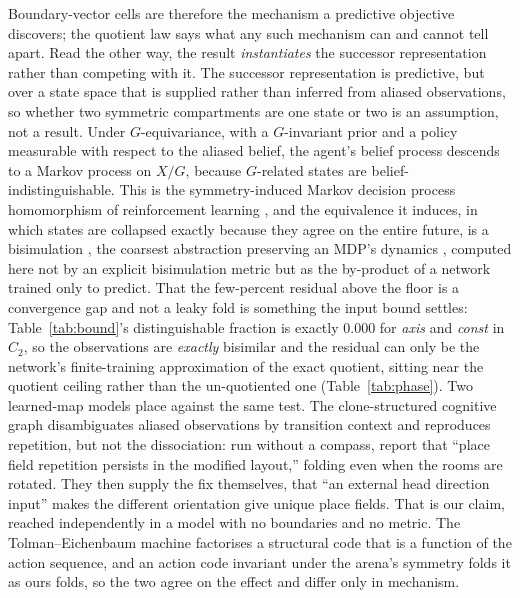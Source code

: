 \documentclass[9pt,lineno]{elife}
\begin{document}
Boundary-vector cells are therefore the mechanism a predictive objective discovers; the quotient law
says what any such mechanism can and cannot tell apart. Read the other way, the result
\emph{instantiates} the successor representation rather than competing with it. The successor
representation \citep{stachenfeld2017, momennejad2017successor} is predictive, but over a state space
that is supplied rather than inferred from aliased observations, so whether two symmetric compartments
are one state or two is an assumption, not a result. Under $G$-equivariance, with a $G$-invariant prior
and a policy measurable with respect to the aliased belief, the agent's belief process descends to a
Markov process on $X/G$, because $G$-related states are belief-indistinguishable. This is the
symmetry-induced Markov decision process homomorphism of reinforcement learning \citep{givan2003,
ravindran2004, vanderpol2020}, and the equivalence it induces, in which states are collapsed exactly
because they agree on the entire future, is a bisimulation \citep{ferns2004}, the coarsest abstraction
preserving an MDP's dynamics \citep{li2006}, computed here not by an explicit bisimulation metric but as
the by-product of a network trained only to predict. That the few-percent residual above the floor is a
convergence gap and not a leaky fold is something the input bound settles: Table~\ref{tab:bound}'s
distinguishable fraction is exactly $0.000$ for \textit{axis} and \textit{const} in $C_2$, so the
observations are \emph{exactly} bisimilar and the residual can only be the network's finite-training
approximation of the exact quotient, sitting near the quotient ceiling rather than the un-quotiented one
(Table~\ref{tab:phase}). Two learned-map models place against the same test. The clone-structured
cognitive graph \citep{george2021, raju2024} disambiguates aliased observations by transition context
and reproduces repetition, but not the dissociation: run without a compass, \citet{raju2024} report that
``place field repetition persists in the modified layout,'' folding even when the rooms are rotated.
They then supply the fix themselves, that ``an external head direction input'' makes the different
orientation give unique place fields. That is our claim, reached independently in a model with no
boundaries and no metric. The Tolman--Eichenbaum machine \citep{whittington2020tolman} factorises a
structural code that is a function of the action sequence, and an action code invariant under the
arena's symmetry folds it as ours folds, so the two agree on the effect and differ only in mechanism.
\end{document}
